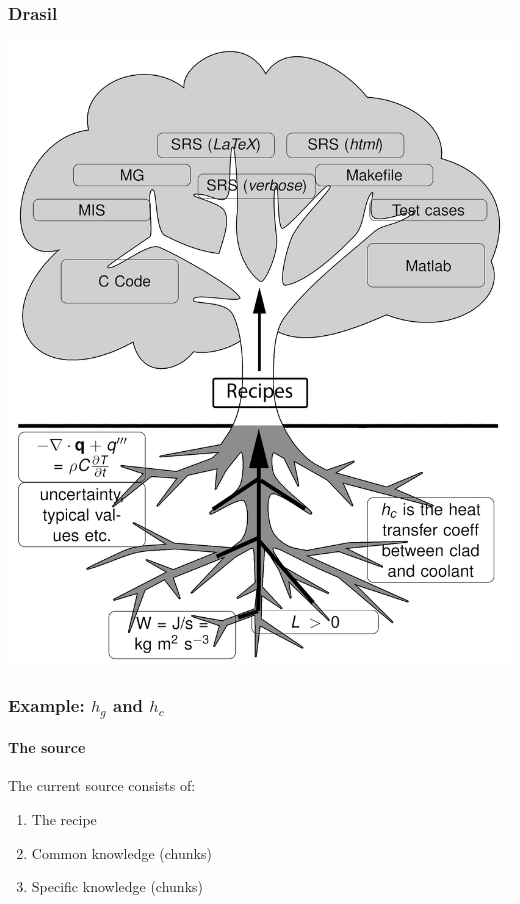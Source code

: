 \documentclass{beamer}
\begin{document}
\begin{frame}

\frametitle{Drasil}
\begin{center}
\includegraphics[width=.65\textwidth]{tree.png}
\end{center}

\end{frame}


\begin{frame}

\frametitle{Example: $h_g$ and $h_c$}

\framesubtitle{The source}

The current source consists of:
\begin{enumerate}
	\item The recipe %
	\item Common knowledge (chunks) %
	\item Specific knowledge (chunks) %

\end{enumerate}
\end{frame}


\end{document}
